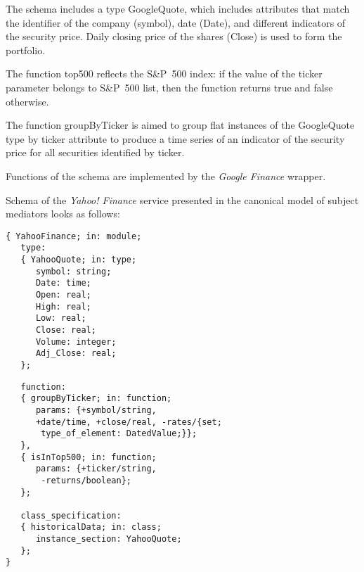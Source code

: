 \begin{multicols}{2}
 \vspace*{-9pt}


{\small

 The schema includes a type {\sf GoogleQuote}, which includes attributes that
match the identifier of the company ({\sf symbol}), date ({\sf Date}), and different
indicators of the security price. Daily closing price of the shares ({\sf Close}) is used
to form the portfolio.

  The function {\sf top500} reflects the S\&P~500 index: if the value of the ticker
parameter belongs to S\&P~500 list, then the function returns {\sf true} and
{\sf false} otherwise.

  The function {\sf groupByTicker} is aimed to group flat instances of the {\sf
GoogleQuote} type by {\sf ticker} attribute to produce a time series of an indicator of
the security price for all securities identified by {\sf ticker}.

  Functions of the schema are implemented by the \textit{Google Finance} wrapper.

  Schema of the \textit{Yahoo! Finance} service presented in the canonical model of
subject mediators looks as follows:
}


\noindent
{\small
  \begin{verbatim}
{ YahooFinance; in: module;
   type:
   { YahooQuote; in: type;
      symbol: string;
      Date: time;
      Open: real;
      High: real;
      Low: real;
      Close: real;
      Volume: integer;
      Adj_Close: real;
   };
   \end{verbatim}
   
   \vspace*{-18pt}
   
   \columnbreak
   

\noindent
\begin{verbatim}
   function:
   { groupByTicker; in: function;
      params: {+symbol/string, 
      +date/time, +close/real, -rates/{set; 
       type_of_element: DatedValue;}};
   },
   { isInTop500; in: function;
      params: {+ticker/string, 
       -returns/boolean};
   };

   class_specification:
   { historicalData; in: class;
      instance_section: YahooQuote;
   };
}
  \end{verbatim}
}


\end{multicols}
